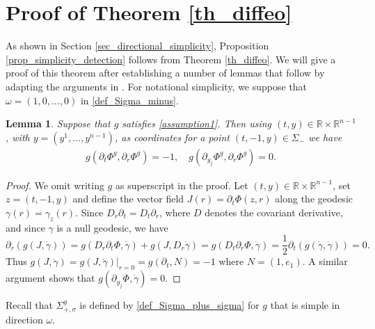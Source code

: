 \documentclass[11pt,letterpaper]{amsart}
\newtheorem{Lemma}[Theorem]{Lemma}
\theoremstyle{definition}
\numberwithin{equation}{section}
\newcommand{\p}{\partial}
\def\p{\partial}
\def\R{\mathbb R}
\begin{document}
\section{Proof of Theorem \ref{th_diffeo}} \label{sec_diffeo_appendix}

As shown in Section \ref{sec_directional_simplicity}, Proposition \ref{prop_simplicity_detection} follows from Theorem \ref{th_diffeo}. We will give a proof of this theorem after establishing a number of lemmas that follow by adapting the arguments in \cite[Section 3]{oksanen2024}. For notational simplicity, we suppose that $\omega = (1,0,\dots,0)$ in \eqref{def_Sigma_minus}.

\begin{Lemma}\label{lem_Jacobi}
Suppose that $g$ satisfies \eqref{assumption1}.
Then using $(t,y) \in \R \times \R^{n-1}$, with $y = (y^1,\dots,y^{n-1})$, as coordinates for a point $(t,-1,y) \in \Sigma_-$
we have
    \begin{align*}
g(\p_t \Phi^g, \p_r \Phi^g) = -1,
\quad
g(\p_{y_j} \Phi^g, \p_r \Phi^g) = 0.
    \end{align*} 
\end{Lemma}
\begin{proof}
We omit writing $g$ as superscript in the proof. 
Let $(t, y) \in \R \times \R^{n-1}$, set $z = (t, -1, y)$ and define the vector field $J(r) = \p_t \Phi(z, r)$ along the geodesic $\gamma(r) = \gamma_{z}(r)$. Since $D_r \p_t = D_t \p_r$, where $D$ denotes the covariant derivative, and since $\gamma$ is a null geodesic, we have  
\[
\p_r (g(J, \dot{\gamma})) = g(D_r \p_t \Phi, \dot{\gamma}) + g(J, D_r \dot{\gamma}) = g(D_t \p_r \Phi, \dot{\gamma}) = \frac{1}{2} \p_t ( g(\dot{\gamma}, \dot{\gamma}) ) = 0.
\]
Thus $g(J, \dot \gamma) = g(J, \dot \gamma)|_{r=0} = g(\p_t, N) = -1$ where $N = (1,e_1)$. A similar argument shows that $g(\p_{y_j} \Phi, \dot{\gamma}) = 0$.
\end{proof}

Recall that $\Sigma_{+,\sigma}^g$ is defined by \eqref{def_Sigma_plus_sigma} for $g$ that is simple in direction $\omega$.
\end{document}
